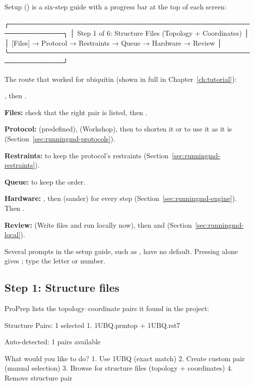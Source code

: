Setup () is a six-step guide with a progress bar at the top of each
screen:

\begin{screen}
╭─────────────────────────────────────────────────────────────╮
│ Step 1 of 6: Structure Files (Topology + Coordinates)       │
│ [Files] → Protocol → Restraints → Queue → Hardware → Review │
╰─────────────────────────────────────────────────────────────╯
\end{screen}

The route that worked for ubiquitin (shown in full in
Chapter~\ref{ch:tutorial}):

\begin{steps}
  \item {}, then .
  \item \textbf{Files:} check that the right pair is listed, then .
  \item \textbf{Protocol:}  (predefined),  (Workshop), then
         to shorten it or  to use it as it is
        (Section~\ref{sec:runningmd-protocols}).
  \item \textbf{Restraints:}  to keep the protocol's restraints
        (Section~\ref{sec:runningmd-restraints}).
  \item \textbf{Queue:}  to keep the order.
  \item \textbf{Hardware:} , then  (sander) for every step
        (Section~\ref{sec:runningmd-engine}). Then .
  \item \textbf{Review:}  (Write files and run locally now), then
         and  (Section~\ref{sec:runningmd-local}).
\end{steps}

Several prompts in the setup guide, such as , have no
default. Pressing  alone gives ; type the letter or number.

\subsection{Step 1: Structure files}

ProPrep lists the topology--coordinate pairs it found in the project:

\begin{screen}
  Structure Pairs: 1 selected
    1. 1UBQ.prmtop + 1UBQ.rst7

  Auto-detected: 1 pairs available

What would you like to do?
   1. Use 1UBQ (exact match)
   2. Create custom pair (manual selection)
   3. Browse for structure files (topology + coordinates)
   4. Remove structure pair
\end{screen}

